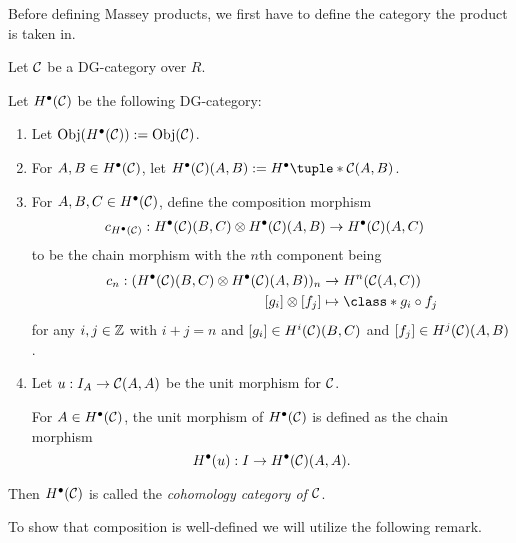 Before defining Massey products, we first have to define the category the product is taken in.

\begin{definition}
    \label{def:H_bullet_dg_category}
    Let \( {\mathcal{C}} \) be a DG-category over \( R \).

    Let \( H^\bullet({\mathcal{C}}) \) be the following DG-category:
    \begin{enumerate}
        \item Let \( \operatorname{Obj}(H^\bullet({\mathcal{C}})) := \operatorname{Obj}({\mathcal{C}}) \).
        \item For \( A, B \in H^\bullet({\mathcal{C}}) \), let \( H^\bullet(\Cc)(A, B) := H^\bullet \tuple*{\Cc(A, B)} \).
        \item {
            For \( A, B, C \in H^\bullet({\mathcal{C}}) \), define the composition morphism
            \begin{align*}
                c_{H^\bullet({\mathcal{C}})}: H^\bullet({\mathcal{C}})(B, C) \otimes H^\bullet({\mathcal{C}})(A, B) &\to H^\bullet({\mathcal{C}})(A, C)
            \end{align*}
            to be the chain morphism with the \( n \)th component being
            \begin{align*}
                c_n: (H^\bullet(\Cc)(B, C) \otimes H^\bullet(\Cc)(A, B))_n &\to H^n(\Cc(A, C)) \\
                [g_i] \otimes [f_j] &\mapsto \class*{g_i \circ f_j}
            \end{align*}
            for any \( i, j \in {\mathbb{Z}} \) with \( i + j = n \) and \( [g_i] \in H^i({\mathcal{C}})(B, C) \) and \( [f_j] \in H^j({\mathcal{C}})(A, B) \).
        }
        \item {
            Let \( u: I_A \to {\mathcal{C}}(A, A) \) be the unit morphism for \( {\mathcal{C}} \).
            
            For \( A \in H^\bullet({\mathcal{C}}) \), the unit morphism of \( H^\bullet({\mathcal{C}}) \) is defined as the chain morphism
            \[
                H^\bullet(u): I \to H^\bullet({\mathcal{C}})(A, A).
            \]
        }
    \end{enumerate}

    Then \( H^\bullet({\mathcal{C}}) \) is called the \emph{cohomology category of \( {\mathcal{C}} \)}.
\end{definition}

To show that composition is well-defined we will utilize the following remark.

